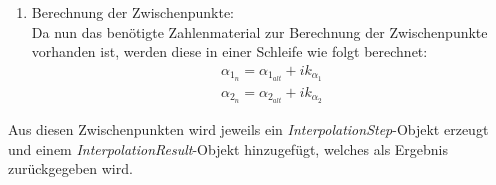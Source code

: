 \begin{itemize}
\begin{enumerate}
\item Berechnung der Zwischenpunkte:\\
Da nun das benötigte Zahlenmaterial zur Berechnung der Zwischenpunkte vorhanden ist, werden diese in einer Schleife wie folgt berechnet:
\begin{align*}
\alpha_{1_n} = \alpha_{1_{alt}} + ik_{\alpha_1}\\
\alpha_{2_n} = \alpha_{2_{alt}} + ik_{\alpha_2}
\end{align*}
\end{enumerate}
Aus diesen Zwischenpunkten wird jeweils ein \textit{InterpolationStep}-Objekt erzeugt und einem \textit{InterpolationResult}-Objekt hinzugefügt, welches als Ergebnis zurückgegeben wird.
\end{itemize}